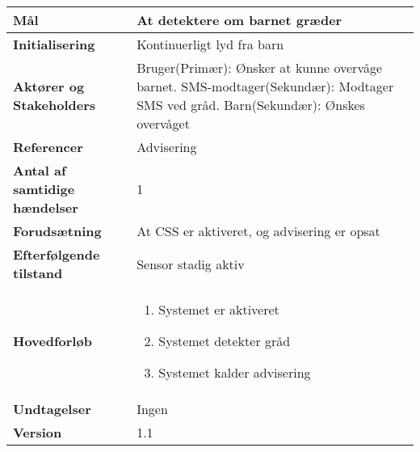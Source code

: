 \begin{table}[H] \centering
\begin{tabular}{|p{6cm}|p{8cm}|}
	\hline
\textbf{Mål}								
&At detektere om barnet græder \\\hline
\textbf{Initialisering}					
&Kontinuerligt lyd fra barn \\\hline
\textbf{Aktører og Stakeholders}			
&Bruger(Primær): Ønsker at kunne overvåge barnet. SMS-modtager(Sekundær): 					Modtager SMS ved gråd. Barn(Sekundær): Ønskes overvåget 				 \\\hline
\textbf{Referencer}						
&Advisering \\\hline
\textbf{Antal af samtidige hændelser}	
&1 \\\hline
\textbf{Forudsætning}					
&At CSS er aktiveret, og advisering er opsat \\\hline
\textbf{Efterfølgende tilstand}			
&Sensor stadig aktiv \\\hline
\textbf{Hovedforløb}						
&\begin{enumerate}
	
				\item Systemet er aktiveret
												
				\item Systemet detekter gråd
												
				\item Systemet kalder advisering
								
			\end{enumerate}\\\hline
			
\textbf{Undtagelser}					
&Ingen \\\hline
		\textbf{Version}		&1.1 \\\hline
	\end{tabular}
	\label{UC5} 
\end{table}


